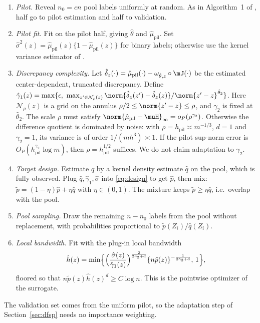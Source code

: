 \begin{enumerate}[label=\arabic*.]
  \item \emph{Pilot.} Reveal $n_0=cn$ pool labels uniformly at random. As in Algorithm~1 of
        \citet{li2026personalizing}, half go to pilot estimation and half to validation.
  \item \emph{Pilot fit.} Fit \dfsp{} on the pilot half, giving $\hat\theta$ and $\hat\mu_{\mathrm{pil}}$.
        Set $\hat\sigma^2(z)=\hat\mu_{\mathrm{pil}}(z)\{1-\hat\mu_{\mathrm{pil}}(z)\}$ for binary labels;
        otherwise use the kernel variance estimator of \citet{li2026personalizing}.
  \item \emph{Discrepancy complexity.} Let
        $\hat\delta_z(\cdot)=\hat\mu_{\mathrm{pil}}(\cdot)-\omega_{\hat\theta,z}\circ\mJ(\cdot)$ be the estimated
        center-dependent, truncated discrepancy. Define
        $\hat\gamma_1(z)=\max\{\epsilon,\ \max_{z'\in\mathcal N_\rho(z)}\norm{\hat\delta_z(z')-\hat\delta_z(z)}/\norm{z'-z}^{\hat\theta_2}\}$.
        Here $\mathcal N_\rho(z)$ is a grid on the annulus $\rho/2\le\norm{z'-z}\le\rho$, and
        $\gamma_2$ is fixed at $\hat\theta_2$. The scale $\rho$ must satisfy
        $\norm{\hat\mu_{\mathrm{pil}}-\muH}_\infty=o_P(\rho^{\gamma_2})$. Otherwise the difference
        quotient is dominated by noise: with $\rho=h_{\mathrm{pil}}\asymp m^{-1/3}$, $d=1$ and
        $\gamma_2=1$, its variance is of order $1/(mh^3)\asymp1$. If the pilot sup-norm error is
        $O_P(h_{\mathrm{pil}}^{\gamma_2}\log m)$, then $\rho=h_{\mathrm{pil}}^{1/2}$ suffices. We do not
        claim adaptation to $\gamma_2$.
  \item \emph{Target design.} Estimate $q$ by a kernel density estimate $\hat q$ on the pool, which
        is fully observed. Plug $\hat q,\hat\gamma_1,\hat\sigma$ into \eqref{eq:design} to get
        $\hat p$, then mix: $\tilde p=(1-\eta)\hat p+\eta\hat q$ with $\eta\in(0,1)$. The mixture keeps
        $\tilde p\ge\eta\hat q$, i.e.\ overlap with the pool.
  \item \emph{Pool sampling.} Draw the remaining $n-n_0$ labels from the pool without replacement,
        with probabilities proportional to $\tilde p(Z_i)/\hat q(Z_i)$.
  \item \emph{Local bandwidth.} Fit \dfsp{} with the plug-in local bandwidth
        \[
          \hat h(z)=\min\Bigl\{\Bigl(\frac{\hat\sigma(z)}{\hat\gamma_1(z)}\Bigr)^{\frac{2}{2\gamma_2+d}}
          \{n\tilde p(z)\}^{-\frac{1}{2\gamma_2+d}},\,1\Bigr\},
        \]
        floored so that $n\tilde p(z)\hat h(z)^d\ge C\log n$. This is the pointwise optimizer of the
        surrogate.
\end{enumerate}
The validation set comes from the uniform pilot, so the adaptation step of Section~\ref{sec:dfsp}
needs no importance weighting.

